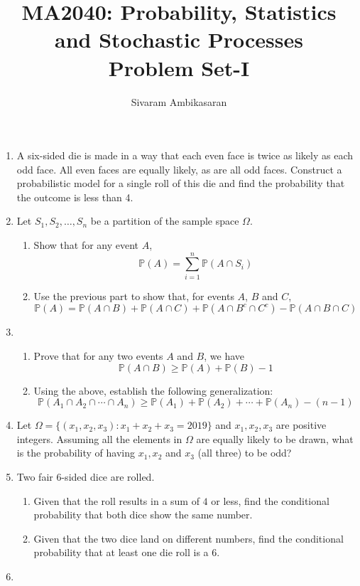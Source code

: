 \documentclass{article}
\title{MA2040: Probability, Statistics and Stochastic Processes\\
Problem Set-I}
\author{Sivaram Ambikasaran}
\newcommand{\dsum}{\displaystyle\sum}
\newcommand{\dcap}{\displaystyle\cap}
\newcommand{\Pb}{\mathbb{P}}
\newcommand{\bkt}[1]{\left(#1\right)}
\begin{document}
	\maketitle
	\begin{enumerate}
		\item
		A six-sided die is made in a way that each even face is twice as likely as each odd face. All even faces are equally likely, as are all odd faces. Construct a probabilistic model for a single roll of this die and find the probability that the outcome is less than 4.
		\item
		Let $S_1,S_2,\ldots,S_n$ be a partition of the sample space $\Omega$.
		\begin{enumerate}
			\item
			Show that for any event $A$,
			$$\Pb(A) = \dsum_{i=1}^n \Pb\bkt{A \dcap S_i}$$
			\item
			Use the previous part to show that, for events $A$, $B$ and $C$,
			$$\Pb\bkt{A} = \Pb\bkt{A \dcap B} + \Pb\bkt{A \dcap C} + \Pb\bkt{A \dcap B^c \dcap C^c} - \Pb\bkt{A \dcap B \dcap C}$$
		\end{enumerate}
		\item
		\begin{enumerate}
			\item
			Prove that for any two events $A$ and $B$, we have
			$$\Pb\bkt{A \dcap B} \geq \Pb(A) + \Pb(B) - 1$$
			\item
			Using the above, establish the following generalization:
			$$\Pb\bkt{A_1 \dcap A_2 \dcap \cdots \dcap A_n} \geq \Pb\bkt{A_1} + \Pb\bkt{A_2} + \cdots + \Pb\bkt{A_n} - \bkt{n-1}$$
		\end{enumerate}
		\item
		Let $\Omega = \{\bkt{x_1,x_2,x_3}: x_1+x_2+x_3 = 2019\}$ and $x_1,x_2,x_3$ are positive integers. Assuming all the elements in $\Omega$ are equally likely to be drawn, what is the probability of having $x_1,x_2$ and $x_3$ (all three) to be odd?
		\item
		Two fair $6$-sided dice are rolled.
		\begin{enumerate}
			\item
			Given that the roll results in a sum of $4$ or less, find the conditional probability that both dice show the same number.
			\item
			Given that the two dice land on different numbers, find the conditional probability that at least one die roll is a $6$.
		\end{enumerate}
		\item

\end{enumerate}
\end{document}
